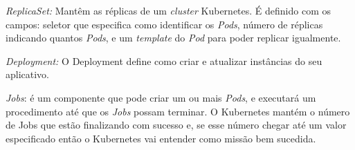 
\textit{ReplicaSet:} Mantêm as réplicas de um \textit{cluster} Kubernetes. É definido com os campos: seletor que especifica como identificar os \textit{Pods}, número de réplicas indicando quantos \textit{Pods}, e um \textit{template} do \textit{Pod} para poder replicar igualmente.

\textit{Deployment:} O Deployment define como criar e atualizar instâncias do seu aplicativo.






\textit{Jobs}: é um componente que pode criar um ou mais \textit{Pods}, e executará um procedimento até que os \textit{Jobs} possam terminar. O Kubernetes mantém o número de Jobs que estão finalizando com sucesso e, se esse número chegar até um valor especificado então o Kubernetes vai entender como missão bem sucedida.


